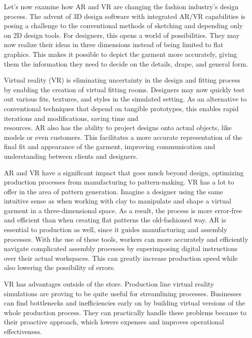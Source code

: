 \documentclass[10pt]{article}
\begin{document}
Let's now examine how AR and VR are changing the fashion industry's design process. The advent of 3D design software with integrated AR/VR capabilities is posing a challenge to the conventional methods of sketching and depending only on 2D design tools. For designers, this opens a world of possibilities. They may now realize their ideas in three dimensions instead of being limited to flat graphics. This makes it possible to depict the garment more accurately, giving them the information they need to decide on the details, drape, and general form.

Virtual reality (VR) is eliminating uncertainty in the design and fitting process by enabling the creation of virtual fitting rooms. Designers may now quickly test out various fits, textures, and styles in the simulated setting. As an alternative to conventional techniques that depend on tangible prototypes, this enables rapid iterations and modifications, saving time and\\
resources. AR also has the ability to project designs onto actual objects, like models or even customers. This facilitates a more accurate representation of the final fit and appearance of the garment, improving communication and understanding between clients and designers.

AR and VR have a significant impact that goes much beyond design, optimizing production processes from manufacturing to pattern-making. VR has a lot to offer in the area of pattern generation. Imagine a designer using the same intuitive sense as when working with clay to manipulate and shape a virtual garment in a three-dimensional space. As a result, the process is more error-free and efficient than when creating flat patterns the old-fashioned way. AR is essential to production as well, since it guides manufacturing and assembly processes. With the use of these tools, workers can more accurately and efficiently navigate complicated assembly processes by superimposing digital instructions over their actual workspaces. This can greatly increase production speed while also lowering the possibility of errors.

VR has advantages outside of the store. Production line virtual reality simulations are proving to be quite useful for streamlining processes. Businesses can find bottlenecks and inefficiencies early on by building virtual versions of the whole production process. They can practically handle these problems because to their proactive approach, which lowers expenses and improves operational effectiveness.
\end{document}
